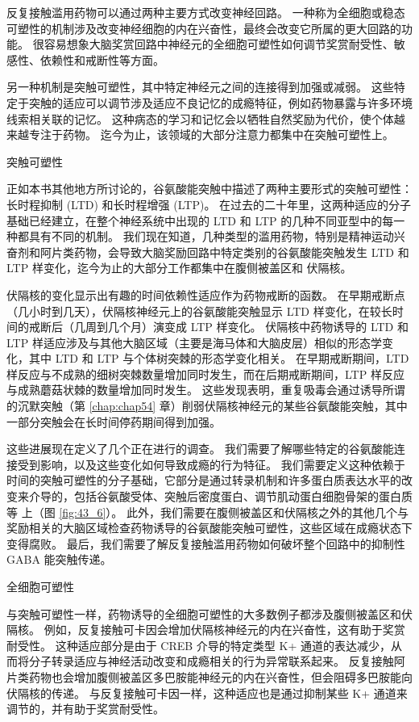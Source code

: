 反复接触滥用药物可以通过两种主要方式改变神经回路。 一种称为全细胞或稳态可塑性的机制涉及改变神经细胞的内在兴奋性，最终会改变它所属的更大回路的功能。 很容易想象大脑奖赏回路中神经元的全细胞可塑性如何调节奖赏耐受性、敏感性、依赖性和戒断性等方面。

另一种机制是突触可塑性，其中特定神经元之间的连接得到加强或减弱。 这些特定于突触的适应可以调节涉及适应不良记忆的成瘾特征，例如药物暴露与许多环境线索相关联的记忆。 这种病态的学习和记忆会以牺牲自然奖励为代价，使个体越来越专注于药物。 迄今为止，该领域的大部分注意力都集中在突触可塑性上。

突触可塑性

正如本书其他地方所讨论的，谷氨酸能突触中描述了两种主要形式的突触可塑性：长时程抑制 (LTD) 和长时程增强 (LTP)。 在过去的二十年里，这两种适应的分子基础已经建立，在整个神经系统中出现的 LTD 和 LTP 的几种不同亚型中的每一种都具有不同的机制。 我们现在知道，几种类型的滥用药物，特别是精神运动兴奋剂和阿片类药物，会导致大脑奖励回路中特定类别的谷氨酸能突触发生 LTD 和 LTP 样变化，迄今为止的大部分工作都集中在腹侧被盖区和 伏隔核。

伏隔核的变化显示出有趣的时间依赖性适应作为药物戒断的函数。 在早期戒断点（几小时到几天），伏隔核神经元上的谷氨酸能突触显示 LTD 样变化，在较长时间的戒断后（几周到几个月）演变成 LTP 样变化。 伏隔核中药物诱导的 LTD 和 LTP 样适应涉及与其他大脑区域（主要是海马体和大脑皮层）相似的形态学变化，其中 LTD 和 LTP 与个体树突棘的形态学变化相关。 在早期戒断期间，LTD 样反应与不成熟的细树突棘数量增加同时发生，而在后期戒断期间，LTP 样反应与成熟蘑菇状棘的数量增加同时发生。 这些发现表明，重复吸毒会通过诱导所谓的沉默突触（第 \ref{chap:chap54} 章）削弱伏隔核神经元的某些谷氨酸能突触，其中一部分突触会在长时间停药期间得到加强。

这些进展现在定义了几个正在进行的调查。 我们需要了解哪些特定的谷氨酸能连接受到影响，以及这些变化如何导致成瘾的行为特征。 我们需要定义这种依赖于时间的突触可塑性的分子基础，它部分是通过转录机制和许多蛋白质表达水平的改变来介导的，包括谷氨酸受体、突触后密度蛋白、调节肌动蛋白细胞骨架的蛋白质等 上（图 \ref{fig:43_6}）。 此外，我们需要在腹侧被盖区和伏隔核之外的其他几个与奖励相关的大脑区域检查药物诱导的谷氨酸能突触可塑性，这些区域在成瘾状态下变得腐败。 最后，我们需要了解反复接触滥用药物如何破坏整个回路中的抑制性 GABA 能突触传递。

全细胞可塑性

与突触可塑性一样，药物诱导的全细胞可塑性的大多数例子都涉及腹侧被盖区和伏隔核。 例如，反复接触可卡因会增加伏隔核神经元的内在兴奋性，这有助于奖赏耐受性。 这种适应部分是由于 CREB 介导的特定类型 K+ 通道的表达减少，从而将分子转录适应与神经活动改变和成瘾相关的行为异常联系起来。 反复接触阿片类药物也会增加腹侧被盖区多巴胺能神经元的内在兴奋性，但会阻碍多巴胺能向伏隔核的传递。 与反复接触可卡因一样，这种适应也是通过抑制某些 K+ 通道来调节的，并有助于奖赏耐受性。

